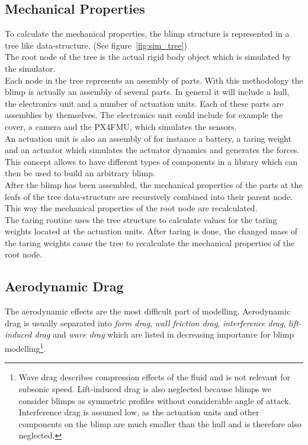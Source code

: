 \subsection{Mechanical Properties}
\label{sub:mech_properties}
To calculate the mechanical properties, the blimp structure is represented in a tree like data-structure. (See figure~\ref{fig:sim_tree})\\
The root node of the tree is the actual rigid body object which is simulated by the simulator.\\
Each node in the tree represents an assembly of parts.
With this methodology the blimp is actually an assembly of several parts. 
In general it will include a hull, the electronics unit and a number of actuation units.
Each of these parts are assemblies by themselves.
The electronics unit could include for example the cover, a camera and the \textsc{PX4FMU}, which simulates the sensors.\\
An actuation unit is also an assembly of for instance a battery, a taring weight and an actuator which simulates the actuator dynamics and generates the forces.\\
This concept allows to have different types of components in a library which can then be used to build an arbitrary blimp.\\
After the blimp has been assembled, the mechanical properties of the parts at the leafs of the tree data-structure are recursively combined into their parent node.
This way the mechanical properties of the root node are recalculated.\\
The taring routine uses the tree structure to calculate values for the taring weights located at the actuation units. 
After taring is done, the changed mass of the taring weights cause the tree to recalculate the mechanical properties of the root node.

\subsection{Aerodynamic Drag}
\label{sub:aero_drag}
The aerodynamic effects are the most difficult part of modelling.
Aerodynamic drag is usually separated into \textit{form drag}, \textit{wall friction drag}, \textit{interference drag}, \textit{lift-induced drag} and \textit{wave drag} which are listed in decreasing importance for blimp modelling\footnote{
Wave drag describes compression effects of the fluid and is not relevant for subsonic speed.
Lift-induced drag is also neglected because blimps we consider blimps as symmetric profiles without considerable angle of attack.
Interference drag is assumed low, as the actuation units and other components on the blimp are much smaller than the hull and is therefore also neglected.
}.


